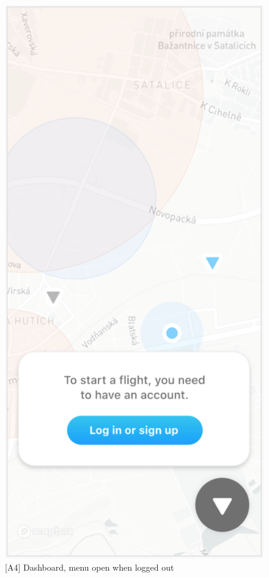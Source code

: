 \begin{figure}
\begin{minipage}{.45\textwidth}
        \includegraphics[width=.7\linewidth]{assets/user_interface_design/dashboard/dashboard_menu_open_login.png}
        \caption[menu open guest]{[A4] Dashboard, menu open when logged out}
        \label{fig:dashboard_menu_open_login}
    \end{minipage}
    \label{fig:dashboard_menu_all}
\end{figure}

